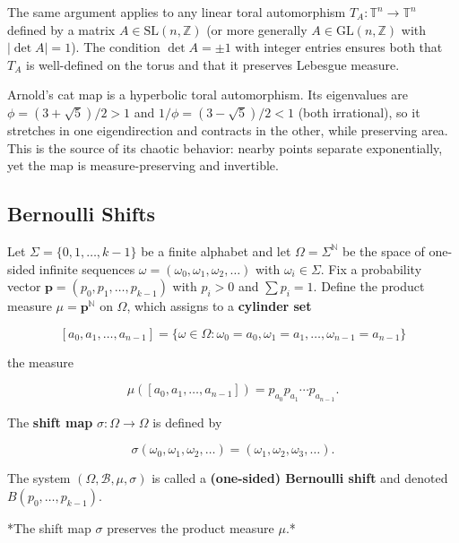 \begin{remark}
The same argument applies to any linear toral automorphism $T_A: \mathbb{T}^n \to \mathbb{T}^n$ defined by a matrix $A \in \text{SL}(n, \mathbb{Z})$ (or more generally $A \in \text{GL}(n, \mathbb{Z})$ with $|\det A| = 1$). The condition $\det A = \pm 1$ with integer entries ensures both that $T_A$ is well-defined on the torus and that it preserves Lebesgue measure.
\end{remark}


\begin{remark}
Arnold's cat map is a hyperbolic toral automorphism. Its eigenvalues are $\phi = (3 + \sqrt{5})/2 > 1$ and $1/\phi = (3 - \sqrt{5})/2 < 1$ (both irrational), so it stretches in one eigendirection and contracts in the other, while preserving area. This is the source of its chaotic behavior: nearby points separate exponentially, yet the map is measure-preserving and invertible.
\end{remark}


\subsection{Bernoulli Shifts}\label{sec:8.2.5}

Let $\Sigma = \{0, 1, \ldots, k-1\}$ be a finite alphabet and let $\Omega = \Sigma^{\mathbb{N}}$ be the space of one-sided infinite sequences $\omega = (\omega_0, \omega_1, \omega_2, \ldots)$ with $\omega_i \in \Sigma$. Fix a probability vector $\mathbf{p} = (p_0, p_1, \ldots, p_{k-1})$ with $p_i > 0$ and $\sum p_i = 1$. Define the product measure $\mu = \mathbf{p}^{\mathbb{N}}$ on $\Omega$, which assigns to a \textbf{cylinder set}

\[
[a_0, a_1, \ldots, a_{n-1}] = \{\omega \in \Omega : \omega_0 = a_0, \omega_1 = a_1, \ldots, \omega_{n-1} = a_{n-1}\}
\]

the measure

\[
\mu([a_0, a_1, \ldots, a_{n-1}]) = p_{a_0} p_{a_1} \cdots p_{a_{n-1}}.
\]

The \textbf{shift map} $\sigma: \Omega \to \Omega$ is defined by

\[
\sigma(\omega_0, \omega_1, \omega_2, \ldots) = (\omega_1, \omega_2, \omega_3, \ldots).
\]

The system $(\Omega, \mathcal{B}, \mu, \sigma)$ is called a \textbf{(one-sided) Bernoulli shift} and denoted $B(p_0, \ldots, p_{k-1})$.

\begin{proposition}\label{prop:8.13.}
*The shift map $\sigma$ preserves the product measure $\mu$.*
\end{proposition}


